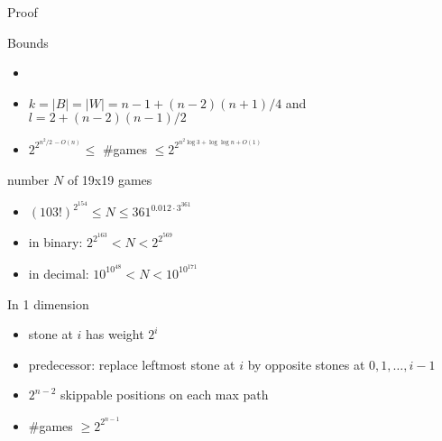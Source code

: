\documentclass{prosper}
\begin{document}
\begin{slide}{Proof}
\epsfxsize=5cm 
\end{slide}

\begin{slide}{Bounds}
\begin{itemize}
\item
{\epsfxsize=4cm }
\item
$k=|B|=|W|=n-1+(n-2)(n+1)/4$ and $l=2+(n-2)(n-1)/2$
\item
$2^{2^{n^2/2\,-O(n)}} \leq$  \#games $\leq 2^{2^{n^2 \log 3+\log\log n + O(1)}}$
\end{itemize}
\end{slide}

\begin{slide}{number $N$ of 19x19 games}
\begin{itemize}
\item
$(103!)^{2^{154}} \leq N \leq 361^{0.012\cdot 3^{361}}$
\item in binary: $2^{2^{163}} < N <2^{2^{569}}$
\item in decimal: $10^{10^{48}} < N <10^{10^{171}}$
\end{itemize}
\end{slide}

\begin{slide}{In 1 dimension}
\begin{minipage}{5cm}
\begin{itemize}
\item stone at $i$ has weight $2^i$
\item predecessor: replace leftmost stone at $i$
by opposite stones at $0,1,\ldots,i-1$
\item $2^{n-2}$ skippable positions on each max path
\item \#games $\geq 2^{2^{n-1}}$
\end{itemize}
\end{minipage}
\begin{minipage}{6cm}
{\epsfxsize=6cm }
\end{minipage}
\end{slide}

\end{document}
